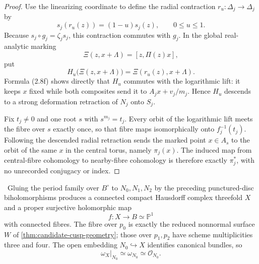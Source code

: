 \begin{proof}
Use the linearizing coordinate to define the radial contraction
\(r_u:\Delta_j\to\Delta_j\) by
\[
 s_j(r_u(z))=(1-u)s_j(z),\qquad 0\le u\le1.
\]
Because \(s_j\circ g_j=\zeta_js_j\), this contraction commutes with
\(g_j\).  In the global real-analytic marking
\[
 \Xi(z,x+\Lambda)=[z,\Pi(z)x],
\]
put
\[
 H_u\bigl(\Xi(z,x+\Lambda)\bigr)
   =\Xi(r_u(z),x+\Lambda).
\]
Formula (2.8f) shows directly that \(H_u\) commutes with the logarithmic
lift: it keeps \(x\) fixed while both composites send it to
\(A_jx+v_j/m_j\).  Hence \(H_u\) descends to a strong deformation
retraction of \(N_j\) onto \(S_j\).

Fix \(t_j\ne0\) and one root \(s\) with \(s^{m_j}=t_j\).  Every orbit of
the logarithmic lift meets the fibre over \(s\) exactly once, so that fibre
maps isomorphically onto \(f_j^{-1}(t_j)\).  Following the descended radial
retraction sends the marked point \(x\in A_s\) to the orbit of the same
\(x\) in the central torus, namely \(\pi_j(x)\).  The induced map from
central-fibre cohomology to nearby-fibre cohomology is therefore exactly
\(\pi_j^*\), with no unrecorded conjugacy or index.
\end{proof}

\begin{theorem}
\label{thm:candidate-global-geometry}
\Verified\ Gluing the period family over \(B^\circ\) to
\(N_0,N_1,N_2\) by the preceding punctured-disc biholomorphisms produces a
connected compact Hausdorff complex threefold \(X\) and a proper surjective
holomorphic map
\[
 f:X\longrightarrow B\simeq\mathbb P^1
\]
with connected fibres.  The fibre over \(p_0\) is exactly the reduced
nonnormal surface \(W\) of \cref{thm:candidate-cusp-geometry}; those over
\(p_1,p_2\) have scheme multiplicities three and four.  The open embedding
\(N_0\hookrightarrow X\) identifies canonical bundles, so
\begin{equation}
 \omega_X|_{N_0}\simeq\omega_{N_0}\simeq\mathcal O_{N_0}.
\label{eq:candidate-global-canonical-on-cusp}
\end{equation}
\end{theorem}

